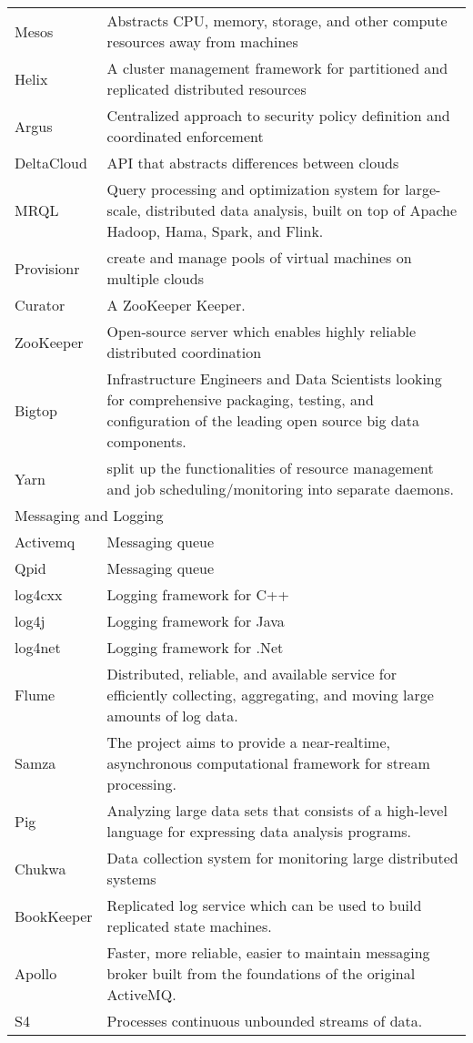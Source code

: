 {\begin{longtable}{|p{2cm} | p{14cm}|}
\\ Mesos & Abstracts CPU, memory, storage, and other compute resources away from machines
\\ Helix & A cluster management framework for partitioned and replicated distributed resources
\\ Argus & Centralized approach to security policy definition and coordinated enforcement
\\ DeltaCloud & API that abstracts differences between clouds
\\ MRQL & Query processing and optimization system for large-scale, distributed data analysis, built on top of Apache Hadoop, Hama, Spark, and Flink.
\\ Provisionr & create and manage pools of virtual machines on multiple clouds
\\ Curator & A ZooKeeper Keeper.
\\ ZooKeeper & Open-source server which enables highly reliable distributed coordination
\\ Bigtop & Infrastructure Engineers and Data Scientists looking for comprehensive packaging, testing, and configuration of the leading open source big data components.
\\ Yarn & split up the functionalities of resource management and job scheduling/monitoring into separate daemons. \\


\hline
\multicolumn{2}{|l|}{Messaging and Logging} \\
\hline

Activemq & Messaging queue
\\ Qpid & Messaging queue
\\ log4cxx & Logging framework for C++
\\ log4j & Logging framework for Java
\\ log4net & Logging framework for .Net
\\ Flume & Distributed, reliable, and available service for efficiently collecting, aggregating, and moving large amounts of log data.
\\ Samza & The project aims to provide a near-realtime, asynchronous computational framework for stream processing.
\\ Pig & Analyzing large data sets that consists of a high-level language for expressing data analysis programs.
\\ Chukwa & Data collection system for monitoring large distributed systems
\\ BookKeeper & Replicated log service which can be used to build replicated state machines.
\\ Apollo & Faster, more reliable, easier to maintain messaging broker built from the foundations of the original ActiveMQ.
\\ S4 &  Processes continuous unbounded streams of data. \\


\end{longtable}}
